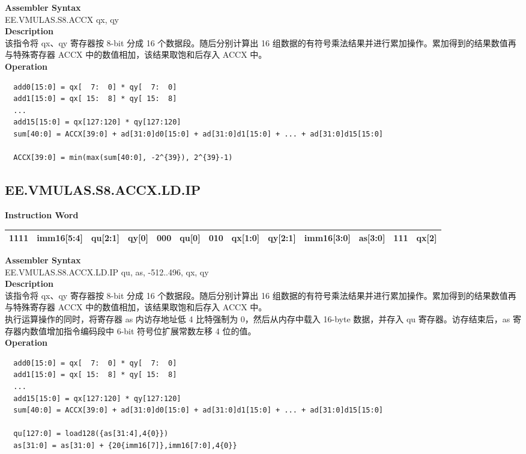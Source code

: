 \textbf{Assembler Syntax} \\
EE.VMULAS.S8.ACCX qx, qy \\
\textbf{Description} \\
该指令将 qx、qy 寄存器按 8-bit 分成 16 个数据段。随后分别计算出 16 组数据的有符号乘法结果并进行累加操作。累加得到的结果数值再与特殊寄存器 ACCX 中的数值相加，该结果取饱和后存入 ACCX 中。\\
\textbf{Operation}
\begin{lstlisting}
  add0[15:0] = qx[  7:  0] * qy[  7:  0]
  add1[15:0] = qx[ 15:  8] * qy[ 15:  8]
  ...
  add15[15:0] = qx[127:120] * qy[127:120]
  sum[40:0] = ACCX[39:0] + ad[31:0]d0[15:0] + ad[31:0]d1[15:0] + ... + ad[31:0]d15[15:0]

  ACCX[39:0] = min(max(sum[40:0], -2^{39}), 2^{39}-1)
\end{lstlisting}

\clearpage
\subsection{EE.VMULAS.S8.ACCX.LD.IP}\label{instruction:EEVMULASS8ACCXLDIP}
\setlength\tabcolsep{6pt}
\textbf{Instruction Word} \\
\begin{tabular}{|c|c|c|c|c|c|c|c|c|c|c|c|c|}
	\hline
	1111 & imm16[5:4] & qu[2:1] & qy[0] & 000 & qu[0] & 010 & qx[1:0] & qy[2:1] & imm16[3:0] & as[3:0] & 111 & qx[2] \\
	\hline
\end{tabular}

\textbf{Assembler Syntax} \\
EE.VMULAS.S8.ACCX.LD.IP qu, as, -512..496, qx, qy \\
\textbf{Description} \\
该指令将 qx、qy 寄存器按 8-bit 分成 16 个数据段。随后分别计算出 16 组数据的有符号乘法结果并进行累加操作。累加得到的结果数值再与特殊寄存器 ACCX 中的数值相加，该结果取饱和后存入 ACCX 中。\\ 执行运算操作的同时，将寄存器 as 内访存地址低 4 比特强制为 0，然后从内存中载入 16-byte 数据，并存入 qu 寄存器。访存结束后，as 寄存器内数值增加指令编码段中 6-bit 符号位扩展常数左移 4 位的值。\\
\textbf{Operation}
\begin{lstlisting}
  add0[15:0] = qx[  7:  0] * qy[  7:  0]
  add1[15:0] = qx[ 15:  8] * qy[ 15:  8]
  ...
  add15[15:0] = qx[127:120] * qy[127:120]
  sum[40:0] = ACCX[39:0] + ad[31:0]d0[15:0] + ad[31:0]d1[15:0] + ... + ad[31:0]d15[15:0]

  qu[127:0] = load128({as[31:4],4{0}})
  as[31:0] = as[31:0] + {20{imm16[7]},imm16[7:0],4{0}}
\end{lstlisting}

